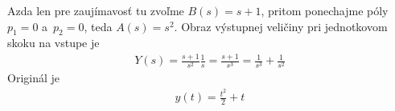 \documentclass[a4paper, 10pt, ]{article}
\begin{document}
Azda len pre zaujímavosť tu zvoľme $B(s) =  s + 1$, pritom ponechajme póly $p_1 = 0$ a~$p_2 = 0$, teda $A(s) = s^2$. Obraz výstupnej veličiny pri jednotkovom skoku na vstupe je
\begin{align}
    Y(s) = \frac{s + 1}{s^2} \frac{1}{s} = \frac{s + 1}{s^3} = \frac{1}{s^3} + \frac{1}{s^2}
\end{align}
Originál je
\begin{align} \label{fun_PCH_AS2R_v3}
    y(t) = \frac{t^2}{2} + t
\end{align}



























\printbibliography[title={Literatúra}]
\end{document}
